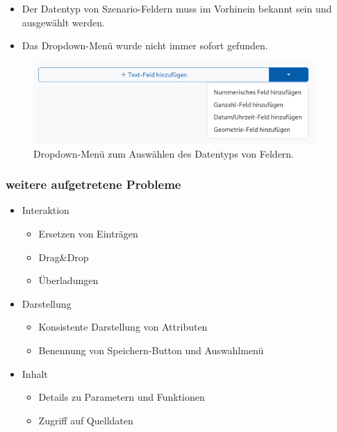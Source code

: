 \begin{frame}

  \begin{itemize}
    \item Der Datentyp von Szenario-Feldern muss im Vorhinein bekannt sein und ausgewählt werden.
    \item Das Dropdown-Menü wurde nicht immer sofort gefunden.
  \end{itemize}

  \begin{figure}
    \begin{center}
      \includegraphics[width=0.95\textwidth]{assets/datatype-dropdown.png}
    \end{center}
    \caption{Dropdown-Menü zum Auswählen des Datentyps von Feldern.}
  \end{figure}

\end{frame}

\begin{frame}
  \frametitle{weitere aufgetretene Probleme}


  \begin{itemize}
    \item Interaktion
          \begin{itemize}
            \item Ersetzen von Einträgen
            \item Drag\&Drop
            \item Überladungen
          \end{itemize}
    \item Darstellung
          \begin{itemize}
            \item Konsistente Darstellung von Attributen
            \item Benennung von Speichern-Button und Auswahlmenü
          \end{itemize}
    \item Inhalt
          \begin{itemize}
            \item Details zu Parametern und Funktionen
            \item Zugriff auf Quelldaten
          \end{itemize}
  \end{itemize}


\end{frame}
